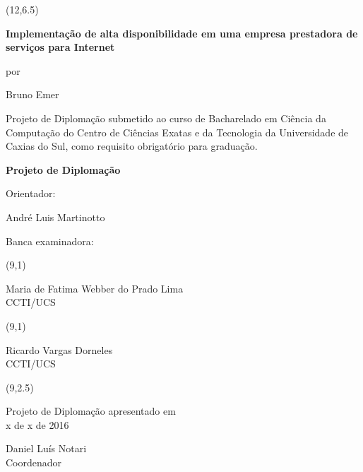\begin{titlepage}
\vfill

\begin{center}
{\setlength{\unitlength}{1cm}\makebox(12,6.5){\parbox[c]{12cm}{\setlength{\parskip}{0.8cm}\center\vskip -1.2cm\LARGE{\bf Implementação de alta disponibilidade em uma empresa prestadora de serviços para Internet}\par \normalsize por\par \large Bruno Emer\par}}}
\end{center}

{\large Projeto de Diplomação submetido ao curso de Bacharelado em Ciência da Computação do Centro de Ciências Exatas e da Tecnologia da Universidade de Caxias do Sul, como requisito obrigatório para graduação.}

\vfill

\begin{center}
{\Large\bf Projeto de Diplomação}
\end{center}

\vfill

\begin{singlespace}
Orientador: {André Luis Martinotto\par}

Banca examinadora:\par
\hspace{1cm} {\setlength{\unitlength}{1cm}
\makebox(9,1){\parbox[c]{9cm}{\center Maria de Fatima Webber do Prado Lima\\ CCTI/UCS}}}\par
\hspace{1cm} {\setlength{\unitlength}{1cm}
\makebox(9,1){\parbox[c]{9cm}{\center Ricardo Vargas Dorneles\\ CCTI/UCS}}}\par

\vfill

\hfill{\setlength{\unitlength}{1cm}\makebox(9,2.5){\parbox[c]{9cm}{\setlength{\parskip}{0.8cm}\center\vskip -1.2cm Projeto de Diplomação apresentado em\\ x de x de 2016\par Daniel Luís Notari\\ Coordenador}}}

\end{singlespace}

\end{titlepage}
